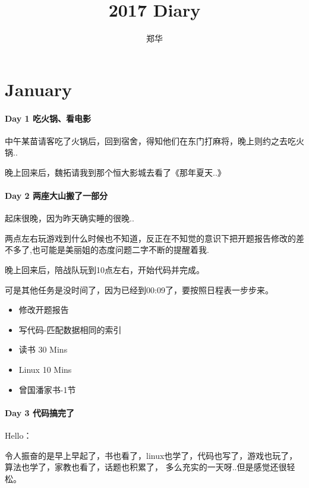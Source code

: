 \documentclass[UTF8,a4paper,8pt]{ctexart}
\author{郑华}
\title{2017 Diary}
\begin{document}
 
 	\maketitle
   
 \section{January}
	 \paragraph{Day 1   吃火锅、看电影    \quad     }
		 中午某苗请客吃了火锅后，回到宿舍，得知他们在东门打麻将，晚上则约之去吃火锅..
		 
		 晚上回来后，魏拓请我到那个恒大影城去看了《那年夏天..》
	 \paragraph{Day 2   两座大山搬了一部分   \quad     }
		 起床很晚，因为昨天确实睡的很晚..
		 
		 两点左右玩游戏到什么时候也不知道，反正在不知觉的意识下把开题报告修改的差不多了,也可能是美丽姐的态度问题二字不断的提醒着我.
		 
		 晚上回来后，陪战队玩到10点左右，开始代码并完成。
		 
		 可是其他任务是没时间了，因为已经到00:09了，要按照日程表一步步来。
		 \begin{itemize}
		 	\item  \makebox[0pt][l]{$\square$}\raisebox{.15ex}{\hspace{0.1em}$\checkmark$}修改开题报告
		 	\item  \makebox[0pt][l]{$\square$}\raisebox{.15ex}{\hspace{0.1em}$\checkmark$}写代码-匹配数据相同的索引
		 	
		 	\item  读书  30 Mins
		 	\item  Linux 10 Mins
		 	
		 	\item  曾国潘家书-1节
		 \end{itemize}
	 \paragraph{Day 3   代码搞完了    \quad     }Hello：
	 
		 令人振奋的是早上早起了，书也看了，linux也学了，代码也写了，游戏也玩了，算法也学了，家教也看了，话题也积累了， 多么充实的一天呀..但是感觉还很轻松。
		 
\end{document}
